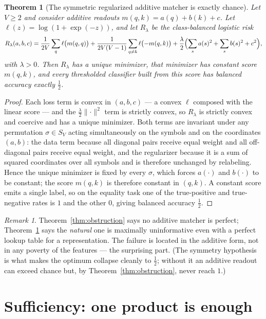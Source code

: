 \documentclass[11pt]{article}
\theoremstyle{plain}
\newtheorem{theorem}{Theorem}
\theoremstyle{definition}
\theoremstyle{remark}
\newtheorem{remark}{Remark}
\begin{document}
\begin{theorem}[The symmetric regularized additive matcher is exactly chance]
\label{thm:chance}
Let $V \geq 2$ and consider additive readouts $m(q,k) = a(q) + b(k) + c$. Let $\ell(z) = \log(1 + \exp(-z))$, and let $R_{\lambda}$ be the class-balanced logistic risk
\[
R_{\lambda}(a,b,c) = \frac{1}{2V}\sum_{q} \ell\bigl(m(q,q)\bigr) + \frac{1}{2V(V-1)}\sum_{q \neq k} \ell\bigl(-m(q,k)\bigr) + \frac{\lambda}{2}\Bigl(\sum_{s} a(s)^{2} + \sum_{s} b(s)^{2} + c^{2}\Bigr),
\]
with $\lambda > 0$. Then $R_{\lambda}$ has a unique minimizer, that minimizer has constant score $m(q,k)$, and every thresholded classifier built from this score has balanced accuracy exactly $\tfrac12$.
\end{theorem}

\begin{proof}
Each loss term is convex in $(a,b,c)$ --- a convex $\ell$ composed with the linear score --- and the $\tfrac{\lambda}{2}\lVert\cdot\rVert^{2}$ term is strictly convex, so $R_{\lambda}$ is strictly convex and coercive and has a unique minimizer. Both terms are invariant under any permutation $\sigma \in S_V$ acting simultaneously on the symbols and on the coordinates $(a,b)$: the data term because all diagonal pairs receive equal weight and all off-diagonal pairs receive equal weight, and the regularizer because it is a sum of squared coordinates over all symbols and is therefore unchanged by relabeling. Hence the unique minimizer is fixed by every $\sigma$, which forces $a(\cdot)$ and $b(\cdot)$ to be constant; the score $m(q,k)$ is therefore constant in $(q,k)$. A constant score emits a single label, so on the equality task one of the true-positive and true-negative rates is $1$ and the other $0$, giving balanced accuracy $\tfrac12$.
\end{proof}

\begin{remark}
Theorem~\ref{thm:obstruction} says no additive matcher is perfect; Theorem~\ref{thm:chance} says the \emph{natural} one is maximally uninformative even with a perfect lookup table for a representation. The failure is located in the additive form, not in any poverty of the features --- the surprising part. (The symmetry hypothesis is what makes the optimum collapse cleanly to $\tfrac12$; without it an additive readout can exceed chance but, by Theorem~\ref{thm:obstruction}, never reach $1$.)
\end{remark}

\section{Sufficiency: one product is enough}
\label{sec:sufficiency}
\end{document}

